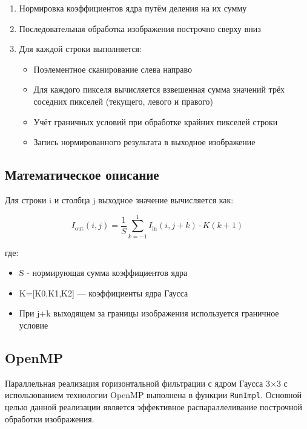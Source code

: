 \documentclass[12pt]{article}
\begin{document}
\begin{enumerate}
\item Нормировка коэффициентов ядра путём деления на их сумму
\item Последовательная обработка изображения построчно сверху вниз
\item Для каждой строки выполняется:
\begin{itemize}
\item Поэлементное сканирование слева направо
\item Для каждого пикселя вычисляется взвешенная сумма значений трёх соседних пикселей (текущего, левого и правого)
\item Учёт граничных условий при обработке крайних пикселей строки
\item Запись нормированного результата в выходное изображение
\end{itemize}
\end{enumerate}

\subsection{Математическое описание}

\hspace*{1.25em}Для строки i и столбца j выходное значение вычисляется как:

\begin{equation}
I_{\text{out}}(i,j) = \frac{1}{S} \sum_{k=-1}^{1} I_{\text{in}}(i,j+k) \cdot K(k+1)
\end{equation}

где:
\begin{itemize}
\item S - нормирующая сумма коэффициентов ядра
\item K=[K0,K1,K2] — коэффициенты ядра Гаусса
\item При j+k выходящем за границы изображения используется граничное условие
\end{itemize}

\subsection{OpenMP}

\hspace*{1.25em}Параллельная реализация горизонтальной фильтрации с ядром Гаусса 3×3 с использованием технологии OpenMP выполнена в функции \texttt{RunImpl}. Основной целью данной реализации является эффективное распараллеливание построчной обработки изображения.
\end{document}
